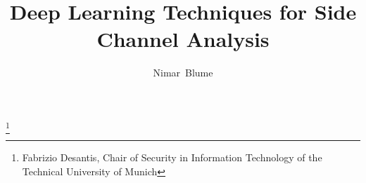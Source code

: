 \documentclass[journal]{IEEEtran}
\makeatletter
\def\markboth#1#2{\def\leftmark{\@IEEEcompsoconly{\sffamily}\MakeUppercase{\protect#1}}%
\def\rightmark{\@IEEEcompsoconly{\sffamily}\MakeUppercase{\protect#2}}}
\makeatother
\begin{document}
\title{Deep Learning Techniques for Side Channel Analysis}
%
%

\author{Nimar~Blume}%
\thanks{Fabrizio Desantis, Chair of Security in Information Technology of the Technical University of Munich}%

% 
%

\markboth{Advanced Seminar for Security in Information Technology, Summer Term 2017}%
{Nimar Blume: Deep Learning Techniques for Side Channel Analysis}

% 
\end{document}
